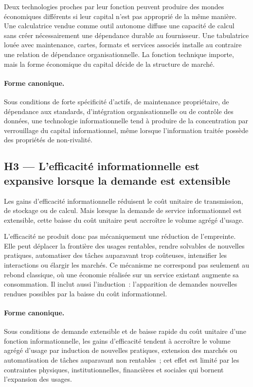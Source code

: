 Deux technologies proches par leur fonction peuvent produire des mondes économiques différents si leur capital n'est pas approprié de la même manière. Une calculatrice vendue comme outil autonome diffuse une capacité de calcul sans créer nécessairement une dépendance durable au fournisseur. Une tabulatrice louée avec maintenance, cartes, formats et services associés installe au contraire une relation de dépendance organisationnelle. La fonction technique importe, mais la forme économique du capital décide de la structure de marché.

\paragraph{Forme canonique.}
Sous conditions de forte spécificité d'actifs, de maintenance propriétaire, de dépendance aux standards, d'intégration organisationnelle ou de contrôle des données, une technologie informationnelle tend à produire de la concentration par verrouillage du capital informationnel, même lorsque l'information traitée possède des propriétés de non-rivalité.

\subsection{H3 --- L'efficacité informationnelle est expansive lorsque la demande est extensible}

Les gains d'efficacité informationnelle réduisent le coût unitaire de transmission, de stockage ou de calcul. Mais lorsque la demande de service informationnel est extensible, cette baisse du coût unitaire peut accroître le volume agrégé d'usage.

L'efficacité ne produit donc pas mécaniquement une réduction de l'empreinte. Elle peut déplacer la frontière des usages rentables, rendre solvables de nouvelles pratiques, automatiser des tâches auparavant trop coûteuses, intensifier les interactions ou élargir les marchés. Ce mécanisme ne correspond pas seulement au rebond classique, où une économie réalisée sur un service existant augmente sa consommation. Il inclut aussi l'induction~: l'apparition de demandes nouvelles rendues possibles par la baisse du coût informationnel.

\paragraph{Forme canonique.}
Sous conditions de demande extensible et de baisse rapide du coût unitaire d'une fonction informationnelle, les gains d'efficacité tendent à accroître le volume agrégé d'usage par induction de nouvelles pratiques, extension des marchés ou automatisation de tâches auparavant non rentables~; cet effet est limité par les contraintes physiques, institutionnelles, financières et sociales qui bornent l'expansion des usages.

